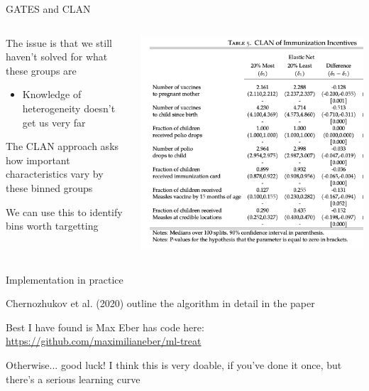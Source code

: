 \documentclass[notes,11pt, aspectratio=169]{beamer}
\newenvironment{wideitemize}{\itemize\addtolength{\itemsep}{10pt}}{\enditemize}
\begin{document}
\begin{frame}{GATES and CLAN}
    \begin{columns}[onlytextwidth, T] %
      \begin{column}{.5\textwidth}
  \begin{wideitemize}
  \item The issue is that we still haven't solved for what these groups are
    \begin{itemize}
    \item Knowledge of heterogeneity doesn't get us very far
    \end{itemize}
  \item The CLAN approach asks how important characteristics vary by
    these binned groups
  \item We can use this to identify bins worth targetting
  \end{wideitemize}
      \end{column}%
      \hfill%
      \begin{column}{.5\textwidth}
        \includegraphics[width=\linewidth]{images/CLAN.png}
      \end{column}%
    \end{columns}
\end{frame}

\begin{frame}{Implementation in practice}
  \begin{wideitemize}
  \item Chernozhukov et al. (2020) outline the algorithm in detail in the paper
  \item Best I have found is Max Eber has code here: \url{https://github.com/maximilianeber/ml-treat}
  \item Otherwise... good luck! I think this is very doable, if you've
    done it once, but there's a serious learning curve
  \end{wideitemize}
  
\end{frame}
\end{document}
